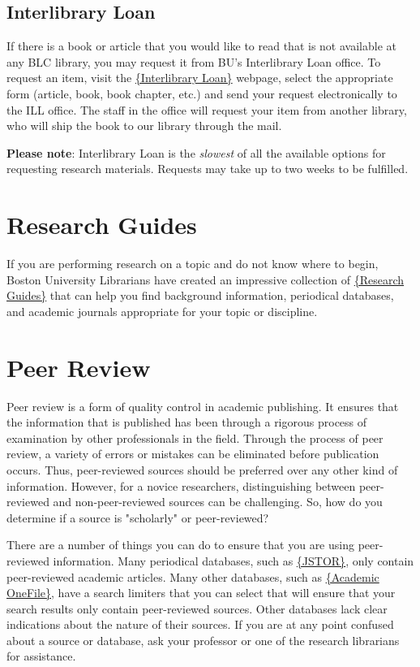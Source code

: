 \documentclass[book]{memoir}
\begin{document}
\subsection{Interlibrary Loan}
If there is a book or article that you would like to read that is not available at any BLC library, you may request it from BU's Interlibrary Loan office. To request an item, visit the \href{http://illiad.bu.edu/illiad/bos/illiad.dll}{\{Interlibrary Loan\}} webpage, select the appropriate form (article, book, book chapter, etc.) and send your request electronically to the ILL office. The staff in the office will request your item from another library, who will ship the book to our library through the mail. 

\textbf{Please note}: Interlibrary Loan is the \emph{slowest} of all the available options for requesting research materials. Requests may take up to two weeks to be fulfilled. 


\section{Research Guides}

If you are performing research on a topic and do not know where to begin, Boston University Librarians have created an impressive collection of \href{http://www.bu.edu/library/guides/index-a-h.html}{\{Research Guides\}} that can help you find background information, periodical databases, and academic journals appropriate for your topic or discipline.

\section{Peer Review}

Peer review is a form of quality control in academic publishing. It ensures that the information that is published has been through a rigorous process of examination by other professionals in the field. Through the process of peer review, a variety of errors or mistakes can be eliminated before publication occurs. Thus, peer-reviewed sources should be preferred over any other kind of information. However, for a novice researchers, distinguishing between peer-reviewed and non-peer-reviewed sources can be challenging. So, how do you determine if a source is "scholarly" or peer-reviewed?

There are a number of things you can do to ensure that you are using peer-reviewed information. Many periodical databases, such as \href{http://www.jstor.org.ezproxy.bu.edu/jstor/}{\{JSTOR\}}, only contain peer-reviewed academic articles. Many other databases, such as \href{http://infotrac.galegroup.com.ezproxy.bu.edu/itweb/mlin_b_bumml?db=AONE}{\{Academic OneFile\}}, have a search limiters that you can select that will ensure that your search results only contain peer-reviewed sources. Other databases lack clear indications about the nature of their sources. If you are at any point confused about a source or database, ask your professor or one of the research librarians for assistance.
\end{document}
